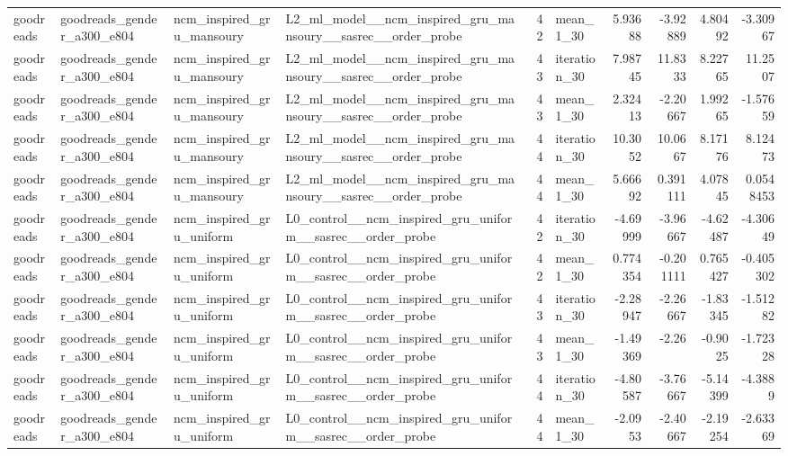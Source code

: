 \begin{table}[htbp!]
\begin{tabular}{llllrlrrrr}
goodreads & goodreads\_gender\_a300\_e804 & ncm\_inspired\_gru\_mansoury & L2\_ml\_model\_\_ncm\_inspired\_gru\_mansoury\_\_sasrec\_\_order\_probe & 42 & mean\_1\_30 & 5.93688 & -3.92889 & 4.80492 & -3.30967 \\
goodreads & goodreads\_gender\_a300\_e804 & ncm\_inspired\_gru\_mansoury & L2\_ml\_model\_\_ncm\_inspired\_gru\_mansoury\_\_sasrec\_\_order\_probe & 43 & iteration\_30 & 7.98745 & 11.8333 & 8.22765 & 11.2507 \\
goodreads & goodreads\_gender\_a300\_e804 & ncm\_inspired\_gru\_mansoury & L2\_ml\_model\_\_ncm\_inspired\_gru\_mansoury\_\_sasrec\_\_order\_probe & 43 & mean\_1\_30 & 2.32413 & -2.20667 & 1.99265 & -1.57659 \\
goodreads & goodreads\_gender\_a300\_e804 & ncm\_inspired\_gru\_mansoury & L2\_ml\_model\_\_ncm\_inspired\_gru\_mansoury\_\_sasrec\_\_order\_probe & 44 & iteration\_30 & 10.3052 & 10.0667 & 8.17176 & 8.12473 \\
goodreads & goodreads\_gender\_a300\_e804 & ncm\_inspired\_gru\_mansoury & L2\_ml\_model\_\_ncm\_inspired\_gru\_mansoury\_\_sasrec\_\_order\_probe & 44 & mean\_1\_30 & 5.66692 & 0.391111 & 4.07845 & 0.0548453 \\
goodreads & goodreads\_gender\_a300\_e804 & ncm\_inspired\_gru\_uniform & L0\_control\_\_ncm\_inspired\_gru\_uniform\_\_sasrec\_\_order\_probe & 42 & iteration\_30 & -4.69999 & -3.96667 & -4.62487 & -4.30649 \\
goodreads & goodreads\_gender\_a300\_e804 & ncm\_inspired\_gru\_uniform & L0\_control\_\_ncm\_inspired\_gru\_uniform\_\_sasrec\_\_order\_probe & 42 & mean\_1\_30 & 0.774354 & -0.201111 & 0.765427 & -0.405302 \\
goodreads & goodreads\_gender\_a300\_e804 & ncm\_inspired\_gru\_uniform & L0\_control\_\_ncm\_inspired\_gru\_uniform\_\_sasrec\_\_order\_probe & 43 & iteration\_30 & -2.28947 & -2.26667 & -1.83345 & -1.51282 \\
goodreads & goodreads\_gender\_a300\_e804 & ncm\_inspired\_gru\_uniform & L0\_control\_\_ncm\_inspired\_gru\_uniform\_\_sasrec\_\_order\_probe & 43 & mean\_1\_30 & -1.49369 & -2.26 & -0.9025 & -1.72328 \\
goodreads & goodreads\_gender\_a300\_e804 & ncm\_inspired\_gru\_uniform & L0\_control\_\_ncm\_inspired\_gru\_uniform\_\_sasrec\_\_order\_probe & 44 & iteration\_30 & -4.80587 & -3.76667 & -5.14399 & -4.3889 \\
goodreads & goodreads\_gender\_a300\_e804 & ncm\_inspired\_gru\_uniform & L0\_control\_\_ncm\_inspired\_gru\_uniform\_\_sasrec\_\_order\_probe & 44 & mean\_1\_30 & -2.0953 & -2.40667 & -2.19254 & -2.63369 \\

\end{tabular}
\end{table}
